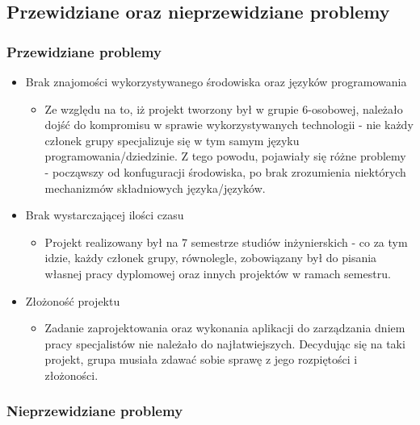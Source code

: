 \newpage
\subsection{Przewidziane oraz nieprzewidziane problemy}

\subsubsection{Przewidziane problemy}

\begin{itemize}
	\item Brak znajomości wykorzystywanego środowiska oraz języków programowania
	\begin{itemize}
		\item Ze względu na to, iż projekt tworzony był w grupie 6-osobowej, należało dojść do kompromisu w sprawie wykorzystywanych technologii - nie każdy członek grupy specjalizuje się w tym samym języku programowania/dziedzinie. Z tego powodu, pojawiały się różne problemy - począwszy od konfuguracji środowiska, po brak zrozumienia niektórych mechanizmów składniowych języka/języków.
	\end{itemize}
	\item Brak wystarczającej ilości czasu
	\begin{itemize}
		\item Projekt realizowany był na 7 semestrze studiów inżynierskich - co za tym idzie, każdy członek grupy, równolegle, zobowiązany był do pisania własnej pracy dyplomowej oraz innych projektów w ramach semestru.
	\end{itemize}
	\item Złożoność projektu
	\begin{itemize}
		\item Zadanie zaprojektowania oraz wykonania aplikacji do zarządzania dniem pracy specjalistów nie należało do najłatwiejszych. Decydując się na taki projekt, grupa musiała zdawać sobie sprawę z jego rozpiętości i złożoności.
	\end{itemize}
\end{itemize}

\subsubsection{Nieprzewidziane problemy}

